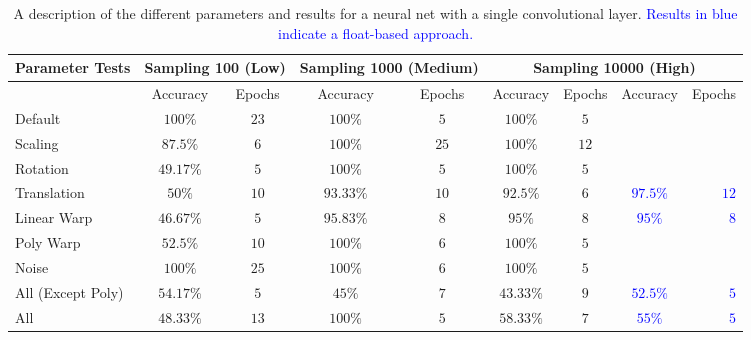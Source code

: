 \documentclass{article}
\begin{document}
\begin{table}[t]
\vskip 0.15in
\begin{center}
\begin{small}
\begin{sc}
\begin{tabular}{lcc|cc|cccr}
\hline
\abovespace\belowspace
Parameter Tests         & \multicolumn{2}{c}{Sampling 100 (Low)} & \multicolumn{2}{c}{Sampling 1000 (Medium)} & \multicolumn{4}{c}{Sampling 10000 (High)} \\
\hline
                        & Accuracy  & Epochs   & Accuracy  & Epochs   & Accuracy  & Epochs   & Accuracy  & Epochs\\
\hline
\abovespace
Default                 & $100\%$   & $23$     & $100\%$    & $5$    & $100\%$   & $5$  &                            & \\
Scaling                 & $87.5\%$  & $6$      & $100\%$    & $25$   & $100\%$   & $12$ &                            &   \\
Rotation                & $49.17\%$ & $5$      & $100\%$    & $5$    & $100\%$   & $5$  &                            &  \\
Translation             & $50\%$    & $10$     & $93.33\%$  & $10$   & $92.5\%$  & $6$  & \textcolor{blue}{$97.5\%$} & \textcolor{blue}{$12$}       \\
Linear Warp             & $46.67\%$ & $5$      & $95.83\%$  & $8$    & $95\%$    & $8$  & \textcolor{blue}{$95\%$}   & \textcolor{blue}{$8$}             \\
Poly Warp               & $52.5\%$  & $10$     & $100\%$    & $6$    & $100\%$   & $5$  &                            &  \\
Noise                   & $100\%$   & $25$     & $100\%$    & $6$    & $100\%$   & $5$  &                            & \\
All (Except Poly)       & $54.17\%$ & $5$      & $45\%$     & $7$    & $43.33\%$ & $9$  & \textcolor{blue}{$52.5\%$} & \textcolor{blue}{$5$}            \\
All                     & $48.33\%$ & $13$     & $100\%$    & $5$    & $58.33\%$ & $7$  & \textcolor{blue}{$55\%$}   & \textcolor{blue}{$5$}           \\
\end{tabular}
\end{sc}
\end{small}
\end{center}
\vskip -0.1in
\caption{A description of the different parameters and results for a neural net with a single convolutional layer. \textcolor{blue}{Results in blue indicate a float-based approach.}}
\label{table:results1}
\end{table}
\end{document}

